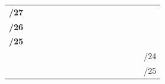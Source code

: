\documentclass[11pt,a4paper]{report}
\begin{document}
\begin{longtable}[c]{rcccccccccccccccc}
\textbf{/27}                                                                               &                               &                                &                                &                               & \cellcolor[HTML]{FFD966}       & \cellcolor[HTML]{FFD966}      &                                &                               &                             &                             &                             &                             &                             &                             &                             &                             \\
\textbf{/26}                                                                               &                               &                                & \cellcolor[HTML]{A9D08E}       & \cellcolor[HTML]{A9D08E}      &                                &                               &                                &                               &                             &                             &                             &                             &                             &                             &                             &                             \\
\textbf{/25}                                                                               & \cellcolor[HTML]{F4B084}      & \cellcolor[HTML]{F4B084}       &                                &                               &                                &                               &                                &                               &                             &                             &                             &                             &                             &                             &                             &                             \\ \hline
                                                                                           & \multicolumn{16}{r}{\cellcolor[HTML]{00B0F0}/24}                                                                                                                                                                                                                                                                                                                                                                                                                                                                  \\
                                                                                           & \multicolumn{2}{r}{\cellcolor[HTML]{F4B084}}                   & \multicolumn{14}{r}{\cellcolor[HTML]{F4B084}/25}                                                                                                                                                                                                                                                                                                                                                                                                 \\

\end{longtable}
\end{document}
